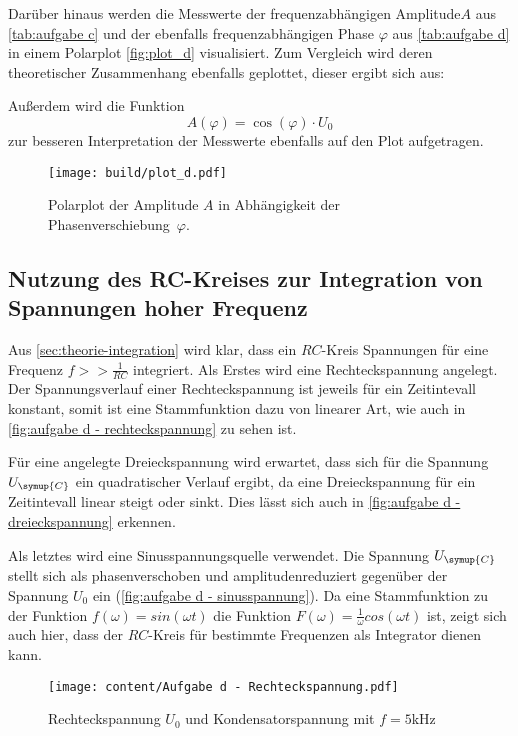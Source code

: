 Darüber hinaus werden die Messwerte der frequenzabhängigen Amplitude$A$ aus \autoref{tab:aufgabe c} und der
ebenfalls frequenzabhängigen Phase $\varphi$ aus \autoref{tab:aufgabe d} in einem Polarplot \autoref{fig:plot_d}
visualisiert.
Zum Vergleich wird deren theoretischer Zusammenhang ebenfalls geplottet, dieser ergibt sich aus:

Außerdem wird die Funktion 
\begin{equation}
  A(\varphi) = \cos (\varphi) \cdot U_{0}
\end{equation}
zur besseren Interpretation der Messwerte ebenfalls auf den Plot aufgetragen.

\begin{figure} [H]
  \centering
  \texttt{[image: build/plot\_d.pdf]}
  \caption{Polarplot der Amplitude $A$ in Abhängigkeit der Phasenverschiebung~$\varphi$.}
  \label{fig:plot_d}
\end{figure}

\subsection{Nutzung des RC-Kreises zur Integration von Spannungen hoher Frequenz}
Aus \autoref{sec:theorie-integration} wird klar, dass ein $RC$-Kreis Spannungen für eine Frequenz $f >> \frac{1}{RC}$
integriert. Als Erstes wird eine Rechteckspannung angelegt. Der Spannungsverlauf einer Rechteckspannung ist jeweils für ein
Zeitintevall konstant, somit ist eine Stammfunktion dazu von linearer Art, wie auch in \autoref{fig:aufgabe d - rechteckspannung}
zu sehen ist.

Für eine angelegte Dreieckspannung wird erwartet, dass sich für die Spannung $U_{\symup{C}}$ ein quadratischer Verlauf ergibt,
da eine Dreieckspannung für ein Zeitintevall linear steigt oder sinkt. Dies lässt sich auch in \autoref{fig:aufgabe d - dreieckspannung}
erkennen.

Als letztes wird eine Sinusspannungsquelle verwendet. Die Spannung $U_{\symup{C}}$ stellt sich als phasenverschoben
und amplitudenreduziert gegenüber der Spannung $U_{0}$ ein (\autoref{fig:aufgabe d - sinusspannung}). Da eine
Stammfunktion zu der Funktion $f(\omega)=sin(\omega t)$ die Funktion $F(\omega) = \frac{1}{\omega}cos(\omega t)$ ist,
zeigt sich auch hier, dass der $RC$-Kreis für bestimmte Frequenzen als Integrator dienen kann.

\begin{figure}
  \centering
  \texttt{[image: content/Aufgabe d - Rechteckspannung.pdf]}
  \caption{Rechteckspannung $U_{0}$ und Kondensatorspannung mit $f=5$kHz}
  \label{fig:aufgabe d - rechteckspannung}
\end{figure}

